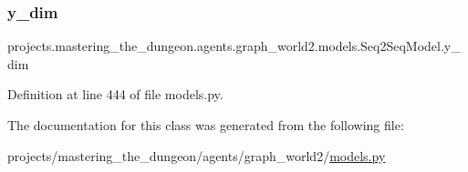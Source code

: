 \subsubsection{\texorpdfstring{y\+\_\+dim}{y\_dim}}
{\footnotesize\ttfamily projects.\+mastering\+\_\+the\+\_\+dungeon.\+agents.\+graph\+\_\+world2.\+models.\+Seq2\+Seq\+Model.\+y\+\_\+dim}



Definition at line 444 of file models.\+py.



The documentation for this class was generated from the following file\+:\begin{DoxyCompactItemize}
\item 
projects/mastering\+\_\+the\+\_\+dungeon/agents/graph\+\_\+world2/\hyperlink{models_8py}{models.\+py}\end{DoxyCompactItemize}
